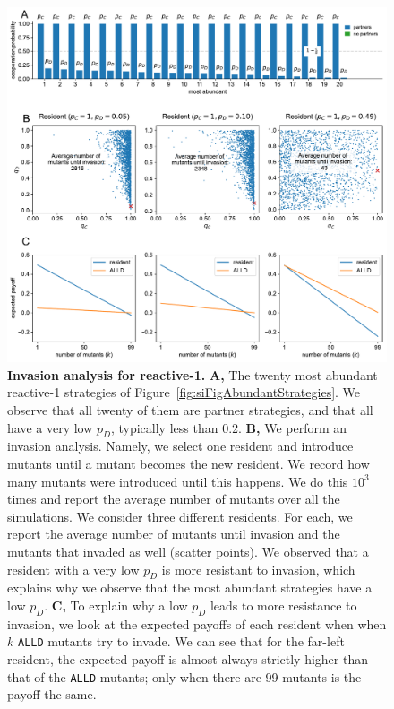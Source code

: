 \documentclass[11pt]{article}
\theoremstyle{plainCl1}
\theoremstyle{plainCl2}
\def\alld{\texttt{ALLD}}
\begin{document}
\begin{figure}[tbhp]
  \centering
  \includegraphics[width=\textwidth]{../../figures/siFigInvasionR1.pdf}
  \caption{\textbf{Invasion analysis for reactive-1.}
  {\bf A,} The twenty most abundant reactive-1 strategies of
  Figure~\ref{fig:siFigAbundantStrategies}. We observe that all twenty of them
  are partner strategies, and that all have a very low \(p_D\), typically less
  than 0.2.
  {\bf B,} We perform an invasion analysis. Namely, we select one resident and introduce
  mutants until a mutant becomes the new resident. We record how many mutants
  were introduced until this happens. We do this \(10^3\) times and report the
  average number of mutants over all the simulations. We consider three different
  residents. For each, we report the average number of mutants until invasion and
  the mutants that invaded as well (scatter points). We observed that a resident with a very low \(p_D\) is more resistant to
  invasion, which explains why we observe that the most abundant strategies have a
  low \(p_D\). 
  {\bf C,} To explain why a low \(p_D\) leads to more resistance to invasion, we
  look at the expected payoffs of each resident when when \(k\) \alld{}
  mutants try to invade. We can see that for the
  far-left resident, the expected payoff is almost always strictly higher than
  that of the \alld{} mutants; only when there are 99 mutants is the payoff the same.}\label{fig:InvasionAnalysisReactive1}
\end{figure}
\end{document}
